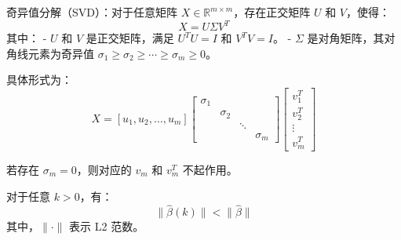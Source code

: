 \documentclass[lang=cn,11pt,a4paper]{elegantpaper}
\begin{document}
\begin{theorem}
    奇异值分解（SVD）：对于任意矩阵 \( X \in \mathbb{R}^{m \times m} \)，存在正交矩阵 \( U \) 和 \( V \)，使得：
    \begin{equation}
    X = U \Sigma V^T
    \end{equation}
    其中：
    - \( U \) 和 \( V \) 是正交矩阵，满足 \( U^T U = I \) 和 \( V^T V = I \)。
    - \( \Sigma \) 是对角矩阵，其对角线元素为奇异值 \( \sigma_1 \geq \sigma_2 \geq \cdots \geq \sigma_m \geq 0 \)。
    
    具体形式为：
    \[
    X = [u_1, u_2, \dots, u_m] \begin{bmatrix}
    \sigma_1 &  &  &  \\
     & \sigma_2 &  &  \\
     &  & \ddots &  \\
     &  &  & \sigma_m
    \end{bmatrix} \begin{bmatrix}
    v_1^T \\
    v_2^T \\
    \vdots \\
    v_m^T
    \end{bmatrix}
    \]
    
    若存在 \(\sigma_m = 0\)，则对应的 \( v_m \) 和 \( v_m^T \) 不起作用。
    \end{theorem}

    \begin{theorem}
        对于任意 \( k > 0 \)，有：
        \begin{equation}
        \| \hat{\beta}(k) \| < \| \hat{\beta} \|
        \end{equation}
        其中，\(\| \cdot \|\) 表示 L2 范数。
        \end{theorem}
        
\end{document}
